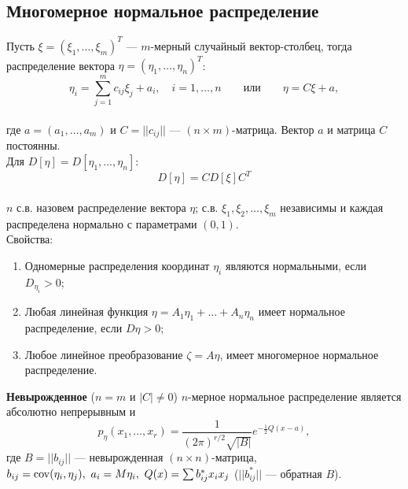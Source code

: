 \subsection{Многомерное нормальное распределение}
Пусть $\xi = (\xi_1, \ldots, \xi_m)^T$ --- $m$-мерный случайный вектор-столбец,
тогда распределение вектора $\eta = (\eta_1, \ldots, \eta_n)^T$:
\begin{equation*}
    \eta_i = \sum_{j = 1}^{m} c_{ij} \xi_j + a_i, \quad i = 1, \ldots, n \qquad \text{или} \qquad \eta = C\xi + a,
\end{equation*}
\\
где $a = (a_1, \ldots, a_m)$ и $C = ||c_{ij}||$ --- $(n \times m)$-матрица.
Вектор $a$ и матрица $C$ постоянны.\\
Для $D[\eta] = D[\eta_1, \ldots, \eta_n]$:
\begin{equation*}
    D[\eta] = CD[\xi]C^T
\end{equation*}
\\
 $n$ с.в. назовем распределение вектора $\eta$;
с.в. $\xi_1, \xi_2, \ldots, \xi_m$ независимы и каждая распределена нормально с параметрами $(0, 1)$.\\
Свойства:
\begin{enumerate}
    \item Одномерные распределения координат $\eta_i$ являются нормальными, если $D_{\eta_i} > 0$;
    \item Любая линейная функция $\eta = A_1\eta_1 + \ldots + A_n\eta_n$ имеет нормальное распределение, если $D\eta > 0$;
    \item Любое линейное преобразование $\zeta = A\eta$, имеет многомерное нормальное распределение.
\end{enumerate}
\textbf{Невырожденное} ($n = m$ и $|C| \neq 0$) $n$-мерное нормальное распределение является абсолютно непрерывным и
\begin{equation*}
    p_\eta(x_1, \ldots, x_r) = \frac{1}{(2\pi)^{r/2} \sqrt{|B|}} e^{-\frac{1}{2} Q(x-a)},
\end{equation*}
где $B = ||b_{ij}||$ --- невырожденная $(n \times n)$-матрица,
$b_{ij} = \mathrm{cov}(\eta_i, \eta_j),\ a_i = M\eta_i,\ Q(x) = \sum b_{ij}^* x_i x_j$ ($||b_{ij}^*||$ --- обратная $B$).
